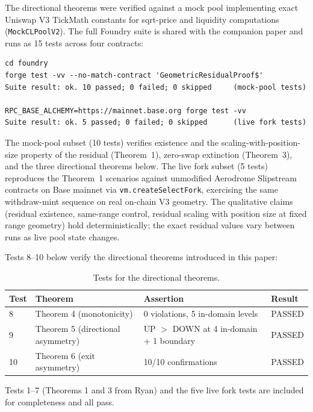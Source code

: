\documentclass[11pt,a4paper]{article}
\theoremstyle{definition}
\newenvironment{codeblock}{%
  \begin{mdframed}[%
    backgroundcolor=brown!3!white,%
    linewidth=0pt,%
    innertopmargin=6pt,%
    innerbottommargin=6pt,%
    innerleftmargin=12pt,%
    innerrightmargin=12pt,%
    leftmargin=0.075\linewidth,%
    rightmargin=0.075\linewidth,%
    skipabove=6pt,%
    skipbelow=6pt%
  ]\footnotesize%
}{%
  \end{mdframed}%
}
\begin{document}
The directional theorems were verified against a mock pool implementing exact Uniswap V3 TickMath constants for sqrt-price and liquidity computations (\texttt{MockCLPoolV2}). The full Foundry suite is shared with the companion paper \cite{ryan2026a} and runs as 15 tests across four contracts:

\begin{codeblock}
\begin{verbatim}
cd foundry
forge test -vv --no-match-contract 'GeometricResidualProof$'
Suite result: ok. 10 passed; 0 failed; 0 skipped     (mock-pool tests)

RPC_BASE_ALCHEMY=https://mainnet.base.org forge test -vv
Suite result: ok. 5 passed; 0 failed; 0 skipped      (live fork tests)
\end{verbatim}
\end{codeblock}

The mock-pool subset (10 tests) verifies existence and the scaling-with-position-size property of the residual (Theorem~1), zero-swap extinction (Theorem~3), and the three directional theorems below. The live fork subset (5 tests) reproduces the Theorem~1 scenarios against unmodified Aerodrome Slipstream contracts on Base mainnet via \texttt{vm.createSelectFork}, exercising the same withdraw-mint sequence on real on-chain V3 geometry. The qualitative claims (residual existence, same-range control, residual scaling with position size at fixed range geometry) hold deterministically; the exact residual values vary between runs as live pool state changes.

Tests 8--10 below verify the directional theorems introduced in this paper:

\begin{table}[H]
\centering
\caption{Tests for the directional theorems.}\label{tab:test-summary}
\begin{tabular}{@{}llll@{}}
\toprule
Test & Theorem & Assertion & Result \\
\midrule
8  & Theorem 4 (monotonicity)          & 0 violations, 5 in-domain levels & PASSED \\
9  & Theorem 5 (directional asymmetry) & UP $>$ DOWN at 4 in-domain + 1 boundary & PASSED \\
10 & Theorem 6 (exit asymmetry)        & 10/10 confirmations          & PASSED \\
\bottomrule
\end{tabular}
\end{table}

\noindent Tests 1--7 (Theorems 1 and 3 from Ryan\cite{ryan2026a}) and the five live fork tests are included for completeness and all pass.
\end{document}
